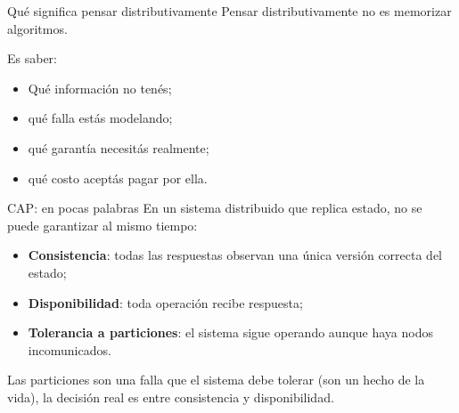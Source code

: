 \documentclass[institutional,screen,none]{ua-engineering-v6-beamer}
\begin{document}
\begin{frame}{Qué significa pensar distributivamente}
Pensar distributivamente no es memorizar algoritmos.

\pause

Es saber:

\begin{itemize}
\item Qué información no tenés;
\item qué falla estás modelando;
\item qué garantía necesitás realmente;
\item qué costo aceptás pagar por ella.
\end{itemize}
\end{frame}


\begin{frame}{CAP: en pocas palabras}
En un sistema distribuido que replica estado, no se puede garantizar al mismo tiempo:

\begin{itemize}
\item \textbf{Consistencia}: todas las respuestas observan una única versión correcta del estado;
\item \textbf{Disponibilidad}: toda operación recibe respuesta;
\item \textbf{Tolerancia a particiones}: el sistema sigue operando aunque haya nodos incomunicados.
\end{itemize}

\pause

\begin{uainfo}
Las particiones son una falla que el sistema debe tolerar (son un hecho de la vida), 
la decisión real es entre consistencia y disponibilidad.
\end{uainfo}
\end{frame}
\end{document}
